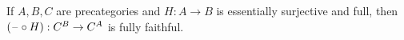 \documentclass[hott-all.tex]{subfiles}
\begin{document}
\begin{lem}
  If $A,B,C$ are precategories and $H:A\to B$ is essentially surjective and full, then $(\mathord{\hspace{1pt}\text{--}\hspace{1pt}}\circ H):C^B \to C^A$ is fully faithful.
\end{lem}
%
\end{document}
